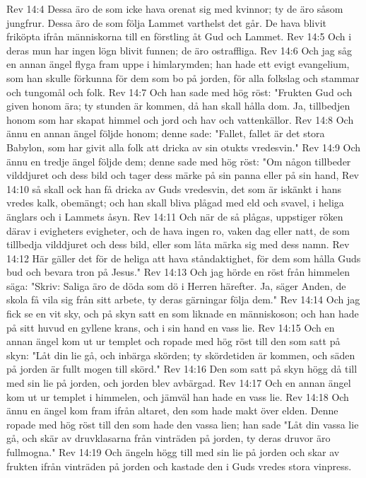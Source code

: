 Rev 14:4  Dessa äro de som icke hava orenat sig med kvinnor; ty de äro såsom jungfrur. Dessa äro de som följa Lammet varthelst det går. De hava blivit friköpta ifrån människorna till en förstling åt Gud och Lammet.
Rev 14:5  Och i deras mun har ingen lögn blivit funnen; de äro ostraffliga.
Rev 14:6  Och jag såg en annan ängel flyga fram uppe i himlarymden; han hade ett evigt evangelium, som han skulle förkunna för dem som bo på jorden, för alla folkslag och stammar och tungomål och folk.
Rev 14:7  Och han sade med hög röst: "Frukten Gud och given honom ära; ty stunden är kommen, då han skall hålla dom. Ja, tillbedjen honom som har skapat himmel och jord och hav och vattenkällor.
Rev 14:8  Och ännu en annan ängel följde honom; denne sade: "Fallet, fallet är det stora Babylon, som har givit alla folk att dricka av sin otukts vredesvin."
Rev 14:9  Och ännu en tredje ängel följde dem; denne sade med hög röst: "Om någon tillbeder vilddjuret och dess bild och tager dess märke på sin panna eller på sin hand,
Rev 14:10  så skall ock han få dricka av Guds vredesvin, det som är iskänkt i hans vredes kalk, obemängt; och han skall bliva plågad med eld och svavel, i heliga änglars och i Lammets åsyn.
Rev 14:11  Och när de så plågas, uppstiger röken därav i evigheters evigheter, och de hava ingen ro, vaken dag eller natt, de som tillbedja vilddjuret och dess bild, eller som låta märka sig med dess namn.
Rev 14:12  Här gäller det för de heliga att hava ståndaktighet, för dem som hålla Guds bud och bevara tron på Jesus."
Rev 14:13  Och jag hörde en röst från himmelen säga: "Skriv: Saliga äro de döda som dö i Herren härefter. Ja, säger Anden, de skola få vila sig från sitt arbete, ty deras gärningar följa dem."
Rev 14:14  Och jag fick se en vit sky, och på skyn satt en som liknade en människoson; och han hade på sitt huvud en gyllene krans, och i sin hand en vass lie.
Rev 14:15  Och en annan ängel kom ut ur templet och ropade med hög röst till den som satt på skyn: "Låt din lie gå, och inbärga skörden; ty skördetiden är kommen, och säden på jorden är fullt mogen till skörd."
Rev 14:16  Den som satt på skyn högg då till med sin lie på jorden, och jorden blev avbärgad.
Rev 14:17  Och en annan ängel kom ut ur templet i himmelen, och jämväl han hade en vass lie.
Rev 14:18  Och ännu en ängel kom fram ifrån altaret, den som hade makt över elden. Denne ropade med hög röst till den som hade den vassa lien; han sade "Låt din vassa lie gå, och skär av druvklasarna från vinträden på jorden, ty deras druvor äro fullmogna."
Rev 14:19  Och ängeln högg till med sin lie på jorden och skar av frukten ifrån vinträden på jorden och kastade den i Guds vredes stora vinpress.
